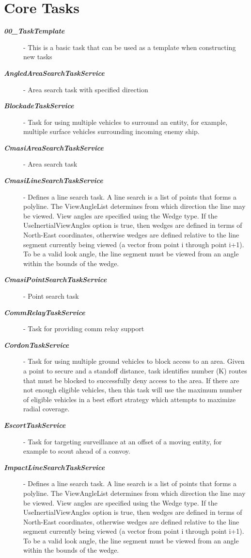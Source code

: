 \section{Core Tasks}
\begin{description}
	\item[\textbf{\textit{00\_TaskTemplate}}] - This is a basic task that can be used as a template when constructing new tasks
	\item[\textbf{\textit{AngledAreaSearchTaskService}}] - Area search task with specified direction 
	\item[\textbf{\textit{BlockadeTaskService}}] - Task for using multiple vehicles to surround an entity, for example, multiple surface vehicles surrounding incoming enemy ship.
	\item[\textbf{\textit{CmasiAreaSearchTaskService}}] - Area search task
	\item[\textbf{\textit{CmasiLineSearchTaskService}}] - Defines a line search task. A line search is a list of points that forms a polyline. The ViewAngleList determines from which direction the line may be viewed. View angles are specified using the Wedge type. If the UseInertialViewAngles option is true, then wedges are defined in terms of North-East coordinates, otherwise wedges are defined relative to the line segment currently being viewed (a vector from point i through point i+1). To be a valid look angle, the line segment must be viewed from an angle within the bounds of the wedge. 
	\item[\textbf{\textit{CmasiPointSearchTaskService}}] - Point search task 
	\item[\textbf{\textit{CommRelayTaskService}}] - Task for providing comm relay support  
	\item[\textbf{\textit{CordonTaskService}}] - Task for using multiple ground vehicles to block access to an area. Given a point to secure and a standoff distance, task identifies number (K) routes that must be blocked to successfully deny access to the area. If there are not enough eligible vehicles, then this task will use the maximum number of eligible vehicles in a best effort strategy which attempts to maximize radial coverage. 
	\item[\textbf{\textit{EscortTaskService}}] - Task for targeting surveillance at an offset of a moving entity, for example to scout ahead of a convoy. 
	\item[\textbf{\textit{ImpactLineSearchTaskService}}] - Defines a line search task. A line search is a list of points that forms a polyline. The ViewAngleList determines from which direction the line may be viewed. View angles are specified using the Wedge type. If the UseInertialViewAngles option is true, then wedges are defined in terms of North-East coordinates, otherwise wedges are defined relative to the line segment currently being viewed (a vector from point i through point i+1). To be a valid look angle, the line segment must be viewed from an angle within the bounds of the wedge.

\end{description}
